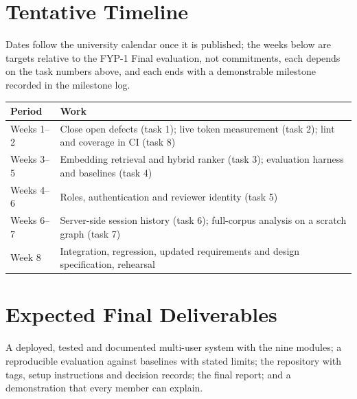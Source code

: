 \section{Tentative Timeline}
Dates follow the university calendar once it is published; the weeks below are targets relative to the FYP-1 Final evaluation, not commitments, each depends on the task numbers above, and each ends with a demonstrable milestone recorded in the milestone log.
\begin{longtable}{p{}p{}}
\toprule \textbf{Period} & \textbf{Work} \\ \midrule \endhead
Weeks 1--2 & Close open defects (task 1); live token measurement (task 2); lint and coverage in CI (task 8) \\
Weeks 3--5 & Embedding retrieval and hybrid ranker (task 3); evaluation harness and baselines (task 4) \\
Weeks 4--6 & Roles, authentication and reviewer identity (task 5) \\
Weeks 6--7 & Server-side session history (task 6); full-corpus analysis on a scratch graph (task 7) \\
Week 8 & Integration, regression, updated requirements and design specification, rehearsal \\
\bottomrule
\end{longtable}
\section{Expected Final Deliverables}
A deployed, tested and documented multi-user system with the nine modules; a reproducible evaluation against baselines with stated limits; the repository with tags, setup instructions and decision records; the final report; and a demonstration that every member can explain.
